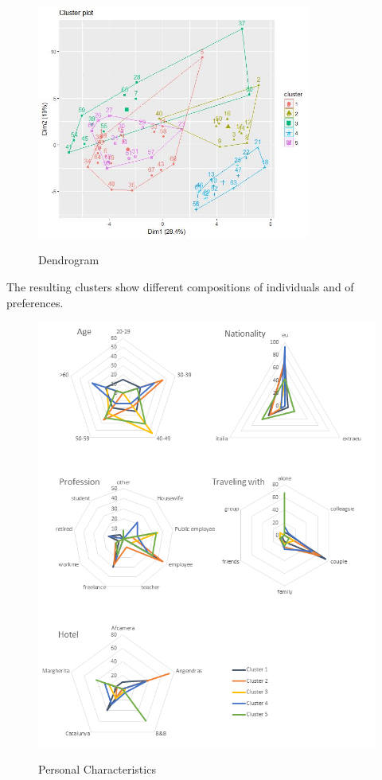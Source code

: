 \documentclass[a4paper]{article}
\begin{document}
\begin{figure}[h]
  \centering
    \includegraphics[width=9cm]{grW5}\\
  \caption{Dendrogram}\label{grW5}
\end{figure}

The resulting clusters show different compositions of individuals and of preferences. 
\begin{figure}[h]
  \centering
    \includegraphics[width=\textwidth]{grafici1}\\
  \caption{Personal Characteristics}\label{gr1}
\end{figure}
\end{document}
